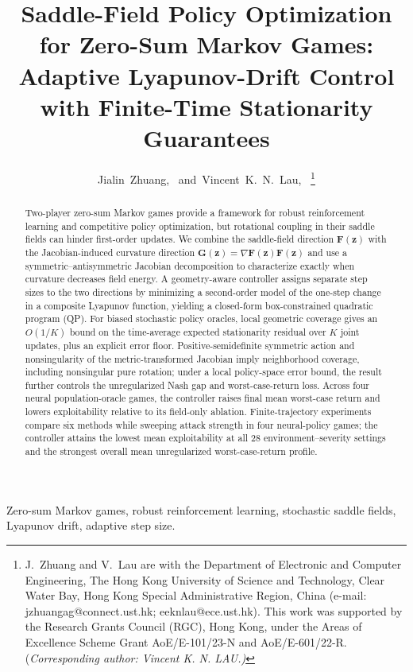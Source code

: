 \documentclass[journal]{IEEEtran}
\title{Saddle-Field Policy Optimization for Zero-Sum Markov Games: Adaptive Lyapunov-Drift Control with Finite-Time Stationarity Guarantees}
\author{Jialin~Zhuang,~\IEEEmembership{Member,~IEEE,}
	and~Vincent~K.~N.~Lau,~\IEEEmembership{Fellow,~IEEE}%
	\thanks{J.~Zhuang and V.~Lau are with the Department of Electronic and Computer Engineering, The Hong Kong University of Science and Technology, Clear Water Bay, Hong Kong Special Administrative Region, China (e-mail: jzhuangag@connect.ust.hk; eeknlau@ece.ust.hk).
		This work was supported by the Research Grants Council (RGC), Hong Kong, under the Areas of Excellence Scheme Grant AoE/E-101/23-N and AoE/E-601/22-R.
		(\em{Corresponding author: Vincent K. N. LAU}.)}
}
\theoremstyle{remark}
\newcommand{\bz}{\boldsymbol{z}}
\newcommand{\bF}{\boldsymbol{F}}
\newcommand{\bG}{\boldsymbol{G}}
\begin{document}
	\maketitle
	\setlength{\abovedisplayskip}{4pt plus 2pt minus 2pt}
	\setlength{\belowdisplayskip}{4pt plus 2pt minus 2pt}
	\setlength{\abovedisplayshortskip}{1pt plus 1pt}
	\setlength{\belowdisplayshortskip}{4pt plus 2pt minus 2pt}
	
\begin{abstract}
Two-player zero-sum Markov games provide a framework for robust reinforcement learning and competitive policy optimization, but rotational coupling in their saddle fields can hinder first-order updates.
We combine the saddle-field direction $\bF(\bz)$ with the Jacobian-induced curvature direction $\bG(\bz)=\nabla\bF(\bz)\bF(\bz)$ and use a symmetric--antisymmetric Jacobian decomposition to characterize exactly when curvature decreases field energy.
A geometry-aware controller assigns separate step sizes to the two directions by minimizing a second-order model of the one-step change in a composite Lyapunov function, yielding a closed-form box-constrained quadratic program (QP).
For biased stochastic policy oracles, local geometric coverage gives an $O(1/K)$ bound on the time-average expected stationarity residual over $K$ joint updates, plus an explicit error floor.
Positive-semidefinite symmetric action and nonsingularity of the metric-transformed Jacobian imply neighborhood coverage, including nonsingular pure rotation; under a local policy-space error bound, the result further controls the unregularized Nash gap and worst-case-return loss.
Across four neural population-oracle games, the controller raises final mean worst-case return and lowers exploitability relative to its field-only ablation.
Finite-trajectory experiments compare six methods while sweeping attack strength in four neural-policy games; the controller attains the lowest mean exploitability at all 28 environment--severity settings and the strongest overall mean unregularized worst-case-return profile.
\end{abstract}
	
	\begin{IEEEkeywords}
		Zero-sum Markov games, robust reinforcement learning, stochastic saddle fields, Lyapunov drift, adaptive step size.
	\end{IEEEkeywords}
	
\end{document}
